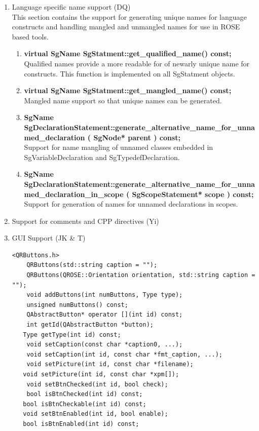 \begin{enumerate}
   \item Language specific name support (DQ) \\
         This section contains the support for generating unique names for language
         constructs and handling mangled and unmangled names for use in ROSE based tools.
   \begin{enumerate}
      \item {\bf virtual SgName SgStatment::get\_qualified\_name() const;} \\
       Qualified names provide a more readable for of newarly unique name for constructs.
       This function is implemented on all SgStatment objects.

      \item {\bf virtual SgName SgStatment::get\_mangled\_name() const;} \\
       Mangled name support so that unique names can be generated.

      \item {\bf SgName SgDeclarationStatement::generate\_alternative\_name\_for\_unnamed\_declaration ( SgNode* parent ) const;} \\
      Support for name mangling of unnamed classes embedded in SgVariableDeclaration and SgTypedefDeclaration.

      \item {\bf SgName SgDeclarationStatement::generate\_alternative\_name\_for\_unnamed\_declaration\_in\_scope ( SgScopeStatement* scope ) const;} \\
      Support for generation of names for unnamed declarations in scopes.

   \end{enumerate}

   \item Support for comments and CPP directives (Yi)

   \item GUI Support (JK \& T)
         \begin{lstlisting}
<QRButtons.h>
	QRButtons(std::string caption = "");
	QRButtons(QROSE::Orientation orientation, std::string caption = "");
	void addButtons(int numButtons, Type type);
	unsigned numButtons() const;
	QAbstractButton* operator [](int id) const;
	int getId(QAbstractButton *button);
   Type getType(int id) const;
	void setCaption(const char *caption0, ...);
	void setCaption(int id, const char *fmt_caption, ...);
	void setPicture(int id, const char *filename);
   void setPicture(int id, const char *xpm[]);
	void setBtnChecked(int id, bool check);
	bool isBtnChecked(int id) const;
   bool isBtnCheckable(int id) const;
   void setBtnEnabled(int id, bool enable);
   bool isBtnEnabled(int id) const;



\end{lstlisting}
\end{enumerate}
